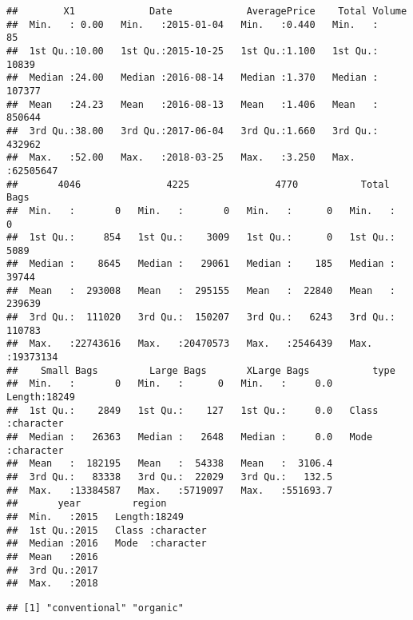 \documentclass[]{book}
\newenvironment{Shaded}{\begin{snugshade}}{\end{snugshade}}
\newcommand{\CommentTok}[1]{\textcolor[rgb]{0.56,0.35,0.01}{\textit{#1}}}
\newcommand{\KeywordTok}[1]{\textcolor[rgb]{0.13,0.29,0.53}{\textbf{#1}}}
\newcommand{\NormalTok}[1]{#1}
\newcommand{\OperatorTok}[1]{\textcolor[rgb]{0.81,0.36,0.00}{\textbf{#1}}}
\begin{document}
\begin{verbatim}
##        X1             Date             AveragePrice    Total Volume     
##  Min.   : 0.00   Min.   :2015-01-04   Min.   :0.440   Min.   :      85  
##  1st Qu.:10.00   1st Qu.:2015-10-25   1st Qu.:1.100   1st Qu.:   10839  
##  Median :24.00   Median :2016-08-14   Median :1.370   Median :  107377  
##  Mean   :24.23   Mean   :2016-08-13   Mean   :1.406   Mean   :  850644  
##  3rd Qu.:38.00   3rd Qu.:2017-06-04   3rd Qu.:1.660   3rd Qu.:  432962  
##  Max.   :52.00   Max.   :2018-03-25   Max.   :3.250   Max.   :62505647  
##       4046               4225               4770           Total Bags      
##  Min.   :       0   Min.   :       0   Min.   :      0   Min.   :       0  
##  1st Qu.:     854   1st Qu.:    3009   1st Qu.:      0   1st Qu.:    5089  
##  Median :    8645   Median :   29061   Median :    185   Median :   39744  
##  Mean   :  293008   Mean   :  295155   Mean   :  22840   Mean   :  239639  
##  3rd Qu.:  111020   3rd Qu.:  150207   3rd Qu.:   6243   3rd Qu.:  110783  
##  Max.   :22743616   Max.   :20470573   Max.   :2546439   Max.   :19373134  
##    Small Bags         Large Bags       XLarge Bags           type          
##  Min.   :       0   Min.   :      0   Min.   :     0.0   Length:18249      
##  1st Qu.:    2849   1st Qu.:    127   1st Qu.:     0.0   Class :character  
##  Median :   26363   Median :   2648   Median :     0.0   Mode  :character  
##  Mean   :  182195   Mean   :  54338   Mean   :  3106.4                     
##  3rd Qu.:   83338   3rd Qu.:  22029   3rd Qu.:   132.5                     
##  Max.   :13384587   Max.   :5719097   Max.   :551693.7                     
##       year         region         
##  Min.   :2015   Length:18249      
##  1st Qu.:2015   Class :character  
##  Median :2016   Mode  :character  
##  Mean   :2016                     
##  3rd Qu.:2017                     
##  Max.   :2018
\end{verbatim}

\begin{Shaded}
\end{Shaded}

\begin{verbatim}
## [1] "conventional" "organic"
\end{verbatim}
\end{document}
